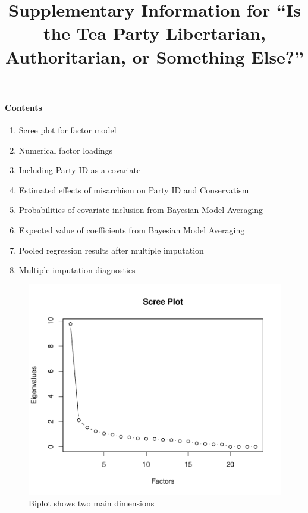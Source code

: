 \documentclass[12pt,]{article}
\title{Supplementary Information for ``Is the Tea Party Libertarian, Authoritarian, or Something Else?''
\vspace{1.25em}}
\author{}
\date{}
\begin{document}
\maketitle

\paragraph{Contents}\label{contents}

\begin{enumerate}
\def\labelenumi{\arabic{enumi}.}
\itemsep1pt\parskip0pt
\item
  Scree plot for factor model
\item
  Numerical factor loadings
\item
  Including Party ID as a covariate
\item
  Estimated effects of misarchism on Party ID and Conservatism
\item
  Probabilities of covariate inclusion from Bayesian Model Averaging
\item
  Expected value of coefficients from Bayesian Model Averaging
\item
  Pooled regression results after multiple imputation
\item
  Multiple imputation diagnostics
\end{enumerate}

\begin{figure}[htbp]
\centering
\includegraphics{figures/scree-1.pdf}
\caption{Biplot shows two main dimensions}
\end{figure}
\end{document}
